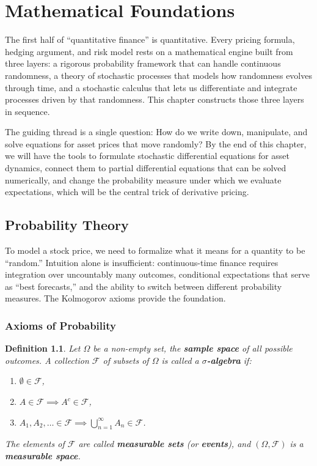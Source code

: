 \documentclass{report}
\theoremstyle{spacedplain}
\theoremstyle{spaceddefinition}
\newtheorem{definition}[theorem]{Definition}
\theoremstyle{spacedremark}
\begin{document}
\chapter{Mathematical Foundations}

The first half of ``quantitative finance'' is quantitative. Every pricing formula, hedging argument, and risk model rests on a mathematical engine built from three layers: a rigorous probability framework that can handle continuous randomness, a theory of stochastic processes that models how randomness evolves through time, and a stochastic calculus that lets us differentiate and integrate processes driven by that randomness. This chapter constructs those three layers in sequence.

The guiding thread is a single question: How do we write down, manipulate, and solve equations for asset prices that move randomly? By the end of this chapter, we will have the tools to formulate stochastic differential equations for asset dynamics, connect them to partial differential equations that can be solved numerically, and change the probability measure under which we evaluate expectations, which will be the central trick of derivative pricing.

\section{Probability Theory}

To model a stock price, we need to formalize what it means for a quantity to be ``random.'' Intuition alone is insufficient: continuous-time finance requires integration over uncountably many outcomes, conditional expectations that serve as ``best forecasts,'' and the ability to switch between different probability measures. The Kolmogorov axioms provide the foundation.

\subsection{Axioms of Probability}

\begin{definition}
Let $\Omega$ be a non-empty set, the \textbf{sample space} of all possible outcomes. A collection $\mathcal{F}$ of subsets of $\Omega$ is called a \textbf{$\sigma$-algebra} if:
\begin{enumerate}
    \item $\emptyset \in \mathcal{F}$,
    \item $A \in \mathcal{F} \implies A^c \in \mathcal{F}$,
    \item $A_1, A_2, \ldots \in \mathcal{F} \implies \bigcup_{n=1}^\infty A_n \in \mathcal{F}$.
\end{enumerate}
The elements of $\mathcal{F}$ are called \textbf{measurable sets} (or \textbf{events}), and $(\Omega, \mathcal{F})$ is a \textbf{measurable space}.
\end{definition}
\end{document}

